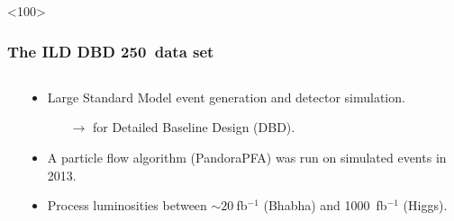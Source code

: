 \begin{frame}<100>
  \frametitle{The \textbf{ILD DBD} 250~\GeV data set}
  \begin{columns}[T,onlytextwidth]
  \begin{column}{0.5\textwidth}
  \begin{table}
  \end{table}
  \end{column}
  \begin{column}{0.5\textwidth}
  \vspace{0.05\textheight} %
  \begin{itemize}
    \item Large Standard Model event generation and detector simulation.
    \begin{itemize}
      \item[$\rightarrow$] for Detailed Baseline Design (DBD).
    \end{itemize}
    \item A particle flow algorithm (PandoraPFA) was run on simulated events in 2013.
    \item Process luminosities between $\sim 20~$fb$^{-1}$ (Bhabha)
        and 1000~fb$^{-1}$ (Higgs).
  \end{itemize}
  \end{column}
  \end{columns}
  \end{frame}

\setcounter{framenumber}{\value{finalframe}}